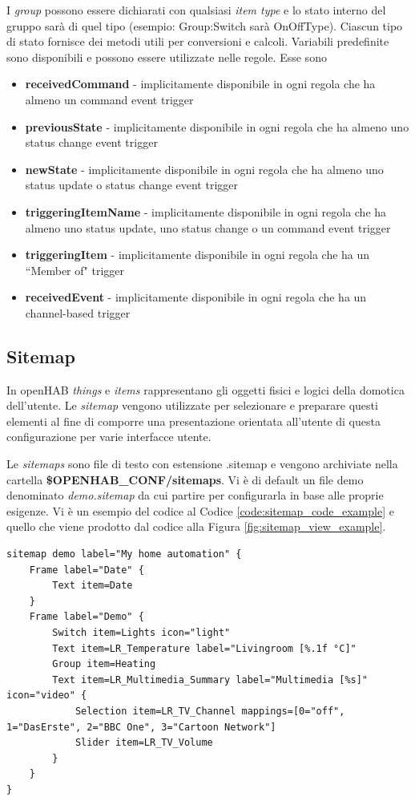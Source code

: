 I {\em group} possono essere dichiarati con qualsiasi {\em item type} e lo stato interno del gruppo sarà di quel tipo (esempio: Group:Switch sarà OnOffType). Ciascun tipo di stato fornisce dei metodi utili per conversioni e calcoli. Variabili predefinite sono disponibili e possono essere utilizzate nelle regole. Esse sono 
\begin{itemize}
    \item \textbf{receivedCommand} - implicitamente disponibile in ogni regola che ha almeno un command event trigger
    \item \textbf{previousState} - implicitamente disponibile in ogni regola che ha almeno uno status change event trigger
    \item \textbf{newState} - implicitamente disponibile in ogni regola che ha almeno uno status update o status change event trigger
    \item \textbf{triggeringItemName} - implicitamente disponibile in ogni regola che ha almeno uno status update, uno status change o un command event trigger
    \item \textbf{triggeringItem} - implicitamente disponibile in ogni regola che ha un ``Member of" trigger
    \item \textbf{receivedEvent} - implicitamente disponibile in ogni regola che ha un channel-based trigger
\end{itemize}

\subsection{Sitemap}
In openHAB {\em things} e {\em items} rappresentano gli oggetti fisici e logici della domotica dell'utente. Le {\em sitemap} vengono utilizzate per selezionare e preparare questi elementi al fine di comporre una presentazione orientata all'utente di questa configurazione per varie interfacce utente.

Le {\em sitemaps} sono file di testo con estensione .sitemap e vengono archiviate nella cartella \textbf{\$OPENHAB\_CONF/sitemaps}. Vi è di default un file demo denominato {\em demo.sitemap} da cui partire per configurarla in base alle proprie esigenze. Vi è un esempio del codice al Codice \ref{code:sitemap_code_example} e quello che viene prodotto dal codice alla Figura \ref{fig:sitemap_view_example}.

\begin{lstlisting}[caption=Esempio Codice di una Sitemap,label=code:sitemap_code_example]
sitemap demo label="My home automation" {
    Frame label="Date" {
        Text item=Date
    }
    Frame label="Demo" {
        Switch item=Lights icon="light"
        Text item=LR_Temperature label="Livingroom [%.1f °C]"
        Group item=Heating
        Text item=LR_Multimedia_Summary label="Multimedia [%s]" icon="video" {
            Selection item=LR_TV_Channel mappings=[0="off", 1="DasErste", 2="BBC One", 3="Cartoon Network"]
            Slider item=LR_TV_Volume
        }
    }
}
\end{lstlisting}

